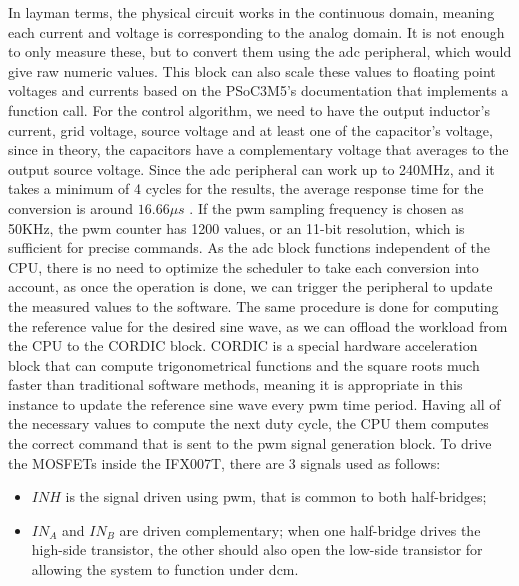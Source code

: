 In layman terms, the physical circuit works in the continuous domain, meaning each current and voltage is corresponding to the analog domain.
It is not enough to only measure these, but to convert them using the \gls{adc} peripheral, which would give raw numeric values.
This block can also scale these values to floating point voltages and currents based on the PSoC3M5's documentation that implements a function call.
For the control algorithm, we need to have the output inductor's current, grid voltage, source voltage and at least one of the capacitor's voltage, since in theory, the capacitors have a complementary voltage that averages to the output source voltage.
Since the \gls{adc} peripheral can work up to 240MHz, and it takes a minimum of 4 cycles for the results, the average response time for the conversion is around $16.66\mu s$ \cite{psocdatasheet}.
If the \gls{pwm} sampling frequency is chosen as 50KHz, the \gls{pwm} counter has 1200 values, or an 11-bit resolution, which is sufficient for precise commands.
As the \gls{adc} block functions independent of the CPU, there is no need to optimize the scheduler to take each conversion into account, as once the operation is done, we can trigger the peripheral to update the measured values to the software.
The same procedure is done for computing the reference value for the desired sine wave, as we can offload the workload from the CPU to the CORDIC block.
CORDIC is a special hardware acceleration block that can compute trigonometrical functions and the square roots much faster than traditional software methods, meaning it is appropriate in this instance to update the reference sine wave every \gls{pwm} time period.
Having all of the necessary values to compute the next duty cycle, the CPU them computes the correct command that is sent to the \gls{pwm} signal generation block.
To drive the MOSFETs inside the IFX007T, there are 3 signals used as follows:
\begin{itemize}
    \item ${INH}$ is the signal driven using \gls{pwm}, that is common to both half-bridges;
    \item $IN_A$ and $IN_B$ are driven complementary; when one half-bridge drives the high-side transistor, the other should also open the low-side transistor for allowing the system to function under \gls{dcm}.
\end{itemize}